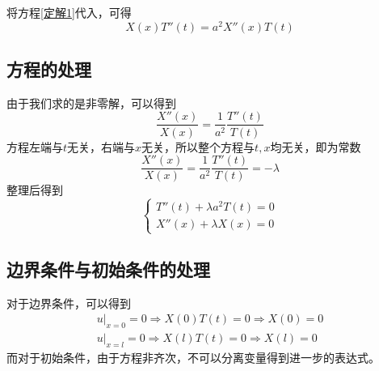 将方程\eqref{定解1}代入，可得
\begin{equation}
	X(x)T''(t)=a^2X''(x)T(t)
\end{equation}

\subsection{方程的处理}
由于我们求的是非零解，可以得到
\begin{equation}
	\dfrac{X''(x)}{X(x)} = \dfrac{1}{a^2}\dfrac{T''(t)}{T(t)}
\end{equation}
方程左端与$t$无关，右端与$x$无关，所以整个方程与$t,x$均无关，即为常数
\begin{equation}
	\dfrac{X''(x)}{X(x)} = \dfrac{1}{a^2}\dfrac{T''(t)}{T(t)} = -\lambda
\end{equation}
整理后得到
\begin{equation}
	\begin{cases}
		T''(t) + \lambda a^2 T(t)=0\\
		X''(x) + \lambda X(x) = 0
	\end{cases}
\end{equation}

\subsection{边界条件与初始条件的处理}
对于边界条件，可以得到
\begin{align*}
	\left. u \right|_{x = 0} = 0 \Rightarrow X(0)T(t) = 0 \Rightarrow X(0) = 0\\
	\left. u \right|_{x = l} = 0 \Rightarrow X(l)T(t) = 0 \Rightarrow X(l) = 0
\end{align*}
而对于初始条件，由于方程非齐次，不可以分离变量得到进一步的表达式。
\vspace*{0.5em}

